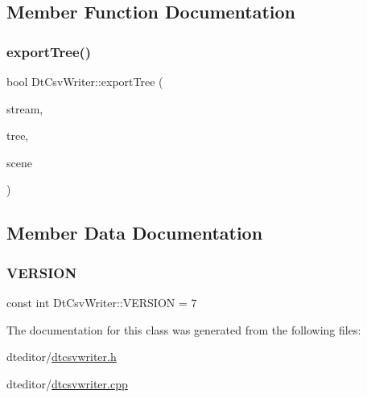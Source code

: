 \subsection{Member Function Documentation}
\mbox{\label{class_dt_csv_writer_aa66c5371953f95c69017505f72f03714}} 
\subsubsection{\texorpdfstring{exportTree()}{exportTree()}}
{\footnotesize\ttfamily bool Dt\+Csv\+Writer\+::export\+Tree (\begin{DoxyParamCaption}\item[{Q\+Text\+Stream \&}]{stream,  }\item[{\mbox{\hyperlink{classdtree_1_1_decision_tree}{dtree\+::\+Decision\+Tree}} $\ast$}]{tree,  }\item[{\mbox{\hyperlink{class_dt_graphics_scene}{Dt\+Graphics\+Scene}} $\ast$}]{scene }\end{DoxyParamCaption})}



\subsection{Member Data Documentation}
\mbox{\label{class_dt_csv_writer_ab4049ecb1ce899489de41d1b726b9059}} 
\subsubsection{\texorpdfstring{VERSION}{VERSION}}
{\footnotesize\ttfamily const int Dt\+Csv\+Writer\+::\+V\+E\+R\+S\+I\+ON = 7\hspace{0.3cm}{\ttfamily [static]}}



The documentation for this class was generated from the following files\+:\begin{DoxyCompactItemize}
\item 
dteditor/\mbox{\hyperlink{dtcsvwriter_8h}{dtcsvwriter.\+h}}\item 
dteditor/\mbox{\hyperlink{dtcsvwriter_8cpp}{dtcsvwriter.\+cpp}}\end{DoxyCompactItemize}
